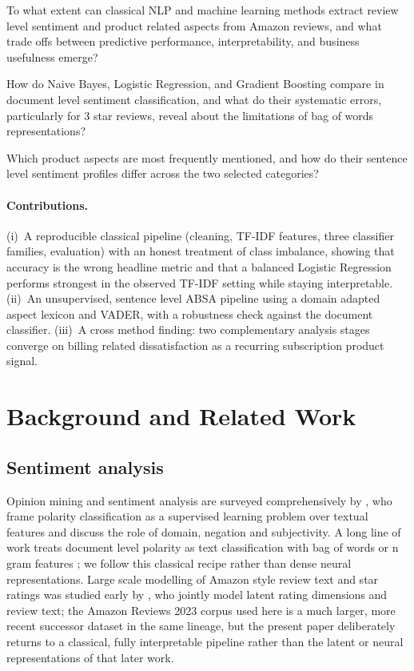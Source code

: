 \documentclass[11pt,a4paper,DIV=12]{scrartcl}
\begin{document}
\begin{description}[leftmargin=1.4em,style=nextline]
  \item[Main RQ] To what extent can classical NLP and machine learning methods
  extract review level sentiment and product related aspects from Amazon
  reviews, and what trade offs between predictive performance, interpretability,
  and business usefulness emerge?
  \item[RQ1] How do Naive Bayes, Logistic Regression, and Gradient Boosting
  compare in document level sentiment classification, and what do their
  systematic errors, particularly for 3 star reviews, reveal about the
  limitations of bag of words representations?
  \item[RQ2] Which product aspects are most frequently mentioned, and how do
  their sentence level sentiment profiles differ across the two selected
  categories?
\end{description}

\paragraph{Contributions.}
(i)~A reproducible classical pipeline (cleaning, TF-IDF features, three
classifier families, evaluation) with an honest treatment of class imbalance,
showing that accuracy is the wrong headline metric and that a balanced Logistic
Regression performs strongest in the observed TF-IDF setting while staying
interpretable.
(ii)~An unsupervised, sentence level ABSA pipeline using a domain adapted aspect
lexicon and VADER, with a robustness check against the document classifier.
(iii)~A cross method finding: two complementary analysis stages converge on
billing related dissatisfaction as a recurring subscription product signal.

\section{Background and Related Work}
\label{sec:related}

\subsection{Sentiment analysis}
Opinion mining and sentiment analysis are surveyed comprehensively by
\citet{pang2008opinion}, who frame polarity classification as a supervised
learning problem over textual features and discuss the role of domain, negation
and subjectivity. A long line of work treats document level polarity as text
classification with bag of words or n gram features
\citep{maas2011learning,manning2008introduction}; we follow this classical
recipe rather than dense neural representations. Large scale modelling of
Amazon style review text and star ratings was studied early by
\citet{mcauley2013hidden}, who jointly model latent rating dimensions and
review text; the Amazon Reviews 2023 corpus used here \citep{hou2024bridging}
is a much larger, more recent successor dataset in the same lineage, but the
present paper deliberately returns to a classical, fully interpretable
pipeline rather than the latent or neural representations of that later work.
\end{document}
